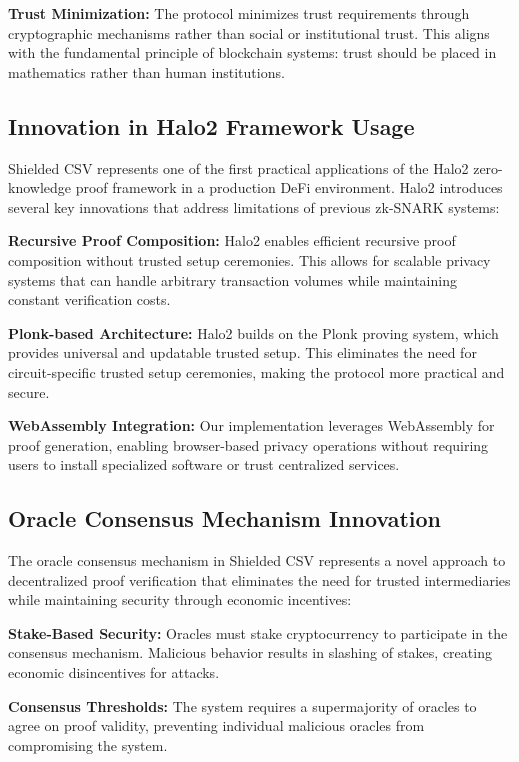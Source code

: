 \documentclass[11pt,a4paper]{article}
\begin{document}
\textbf{Trust Minimization:} The protocol minimizes trust requirements through cryptographic mechanisms rather than social or institutional trust. This aligns with the fundamental principle of blockchain systems: trust should be placed in mathematics rather than human institutions.

\subsection{Innovation in Halo2 Framework Usage}

Shielded CSV represents one of the first practical applications of the Halo2 zero-knowledge proof framework in a production DeFi environment. Halo2 introduces several key innovations that address limitations of previous zk-SNARK systems:

\textbf{Recursive Proof Composition:} Halo2 enables efficient recursive proof composition without trusted setup ceremonies. This allows for scalable privacy systems that can handle arbitrary transaction volumes while maintaining constant verification costs.

\textbf{Plonk-based Architecture:} Halo2 builds on the Plonk proving system, which provides universal and updatable trusted setup. This eliminates the need for circuit-specific trusted setup ceremonies, making the protocol more practical and secure.

\textbf{WebAssembly Integration:} Our implementation leverages WebAssembly for proof generation, enabling browser-based privacy operations without requiring users to install specialized software or trust centralized services.

\subsection{Oracle Consensus Mechanism Innovation}

The oracle consensus mechanism in Shielded CSV represents a novel approach to decentralized proof verification that eliminates the need for trusted intermediaries while maintaining security through economic incentives:

\textbf{Stake-Based Security:} Oracles must stake cryptocurrency to participate in the consensus mechanism. Malicious behavior results in slashing of stakes, creating economic disincentives for attacks.

\textbf{Consensus Thresholds:} The system requires a supermajority of oracles to agree on proof validity, preventing individual malicious oracles from compromising the system.
\end{document}
